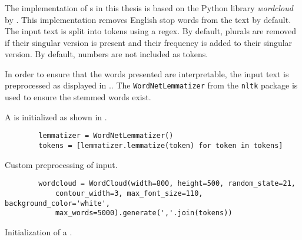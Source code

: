 \subsubsection*{\wordcloud{}}\label{subsubsec:impl-wordcloud}

The implementation of \wordcloud{}s in this thesis is based on the Python library \textit{wordcloud} by \citeauthor{wordcloud-dev} \cite{wordcloud-dev}.
This implementation removes English stop words from the text by default.
The input text is split into tokens using a regex.
By default, plurals are removed if their singular version is present and their frequency is added to their singular version.
By default, numbers are not included as tokens.

In order to ensure that the words presented are interpretable, the input text is preprocessed as displayed in ..
The \texttt{WordNetLemmatizer} from the \texttt{nltk} package is used to ensure the stemmed words exist.

A \wordcloud{} is initialized as shown in .

\begin{listing}[htp]
    \begin{verbatim}
        lemmatizer = WordNetLemmatizer()
        tokens = [lemmatizer.lemmatize(token) for token in tokens]
    \end{verbatim}
    \caption[Custom preprocessing of \wordcloud{} input]
    {Custom preprocessing of \wordcloud{} input.
    }
    \label{lst:impl-preproc-wordcloud}
\end{listing}

\begin{listing}[htp]
    \begin{verbatim}
        wordcloud = WordCloud(width=800, height=500, random_state=21, 
            contour_width=3, max_font_size=110, background_color='white', 
            max_words=5000).generate(','.join(tokens))
    \end{verbatim}
    \caption[Initialization of a \wordcloud{}]
    {Initialization of a \wordcloud{}.
    }
    \label{lst:impl-wordcloud}
\end{listing}

